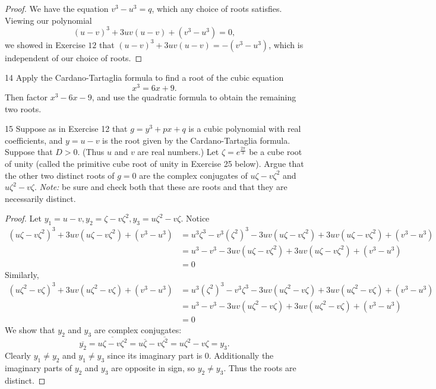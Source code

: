 \begin{proof}
    We have the equation $v^3 - u^3 = q$, which any choice of roots satisfies.  
    Viewing our polynomial 
    \[
    (u - v)^3 + 3uv(u - v) + (v^3 - u^3) = 0,
    \] 
    we showed in Exercise $12$ that $(u - v)^3 + 3uv(u - v) = -(v^3 - u^3)$,
        which is independent of our choice of roots.
\end{proof}

\begin{problem}{14}
    Apply the Cardano-Tartaglia formula to find a root of the cubic equation
    \[x^3 = 6x + 9.\]
    Then factor $x^3 - 6x - 9$, and use the quadratic formula to obtain the remaining two
    roots.
\end{problem}
\unsolved

\begin{problem}{15}
    Suppose as in Exercise 12 that $g = y^3 + px + q$ is a cubic polynomial
    with real coefficients, and $y = u - v$ is the root given by the 
    Cardano-Tartaglia formula. Suppose that $D > 0$. (Thus $u$ and $v$ are real numbers.)
    Let $\zeta = e^{\frac{2\pi}{3}}$ be a cube root of unity (called the primitive cube root of unity 
    in Exercise 25 below). Argue that the other two distinct roots of $g = 0$ are the complex 
    conjugates of $u \zeta - v \zeta^2$ and $u \zeta^2 - v \zeta$. \emph{Note: }
    be sure and check both that these are roots and that they are necessarily distinct.
\end{problem}
\solved

\begin{proof}
    Let $y_1 = u - v, y_2 =  \zeta - v \zeta^2, y_3 = u \zeta^2 - v \zeta$.
    Notice
    \begin{align*}
        (u \zeta - v \zeta^2)^3 + 3uv(u \zeta - v \zeta^2) + (v^3 - u^3)
        &= u^3 \zeta^3 - v^3 (\zeta^2)^3 - 3 uv (u \zeta - v \zeta^2) + 3 uv (u \zeta - v \zeta^2) + (v^3 - u^3) \\
        &= u^3 - v^3 - 3uv(u \zeta - v \zeta^2) + 3 uv (u \zeta - v \zeta^2) + (v^3 - u^3) \\
        &= 0
    \end{align*}
    Similarly,
    \begin{align*}
        (u \zeta^2 - v \zeta)^3 + 3uv(u \zeta^2 - v \zeta) + (v^3 - u^3)
        &= u^3 (\zeta^2)^3 - v^3 \zeta^3 - 3 uv (u \zeta^2 - v \zeta) + 3 uv (u \zeta^2 - v \zeta) + (v^3 - u^3) \\
        &= u^3 - v^3 - 3 uv (u \zeta^2 - v \zeta) + 3 uv (u \zeta^2 - v \zeta) + (v^3 - u^3) \\
        &= 0
    \end{align*}
    We show that $y_2$ and $y_3$ are complex conjugates:
    \[
        \overline{y_2} = \overline{u \zeta - v \zeta^2} = u \overline{\zeta} - v \overline{\zeta^2} = u \zeta^2 - v \zeta = y_3.
    \]
    Clearly $y_1 \ne y_2$ and $y_1 \ne y_3$ since its imaginary part is $0$.
    Additionally the imaginary parts of $y_2$ and $y_3$ are opposite in sign, so $y_2 \neq y_3$. 
    Thus the roots are distinct.
\end{proof}

